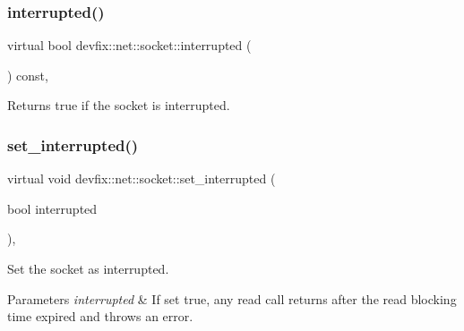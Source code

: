 \mbox{\label{structdevfix_1_1net_1_1socket_a7cfe151f1124d46fb19fad0c374c9352}} 
\subsubsection{\texorpdfstring{interrupted()}{interrupted()}}
{\footnotesize\ttfamily virtual bool devfix\+::net\+::socket\+::interrupted (\begin{DoxyParamCaption}{ }\end{DoxyParamCaption}) const\hspace{0.3cm}{\ttfamily [pure virtual]}, {\ttfamily [noexcept]}}

\begin{DoxyReturn}{Returns}
true if the socket is interrupted. 
\end{DoxyReturn}
\mbox{\label{structdevfix_1_1net_1_1socket_a3fa8d7dcd44e7740b29ad6674005eb5d}} 
\subsubsection{\texorpdfstring{set\+\_\+interrupted()}{set\_interrupted()}}
{\footnotesize\ttfamily virtual void devfix\+::net\+::socket\+::set\+\_\+interrupted (\begin{DoxyParamCaption}\item[{bool}]{interrupted }\end{DoxyParamCaption})\hspace{0.3cm}{\ttfamily [pure virtual]}, {\ttfamily [noexcept]}}

Set the socket as interrupted. 
\begin{DoxyParams}{Parameters}
{\em interrupted} & If set true, any read call returns after the read blocking time expired and throws an error. \\
\hline
\end{DoxyParams}
\mbox{\label{structdevfix_1_1net_1_1socket_ae1cf3b2c4f5d39225d6585c387f967d5}} 
